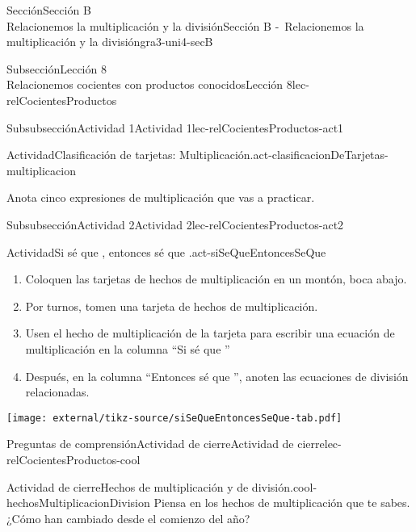 \begin{sectionptx}{Sección}{{\Large Sección B\\}Relacionemos la multiplicación y la división}{}{Sección B -~Relacionemos la multiplicación y la división}{}{}{gra3-uni4-secB}
\begin{subsectionptx}{Subsección}{{\normalsize Lección 8\\[-0.05cm]}Relacionemos cocientes con productos conocidos}{}{Lección 8}{}{}{lec-relCocientesProductos}
\begin{subsubsectionptx}{Subsubsección}{Actividad 1}{}{Actividad 1}{}{}{lec-relCocientesProductos-act1}
\begin{activity}{Actividad}{Clasificación de tarjetas: Multiplicación.}{act-clasificacionDeTarjetas-multiplicacion}
\begin{multicols}{2}
\begin{image}{0}{1}{0}{}
\end{image}%
\end{multicols}
Anota cinco expresiones de multiplicación que vas a practicar.%
\end{activity}%
\end{subsubsectionptx}
%
%
\typeout{************************************************}
\typeout{************************************************}
%
\begin{subsubsectionptx}{Subsubsección}{Actividad 2}{}{Actividad 2}{}{}{lec-relCocientesProductos-act2}
\begin{activity}{Actividad}{Si sé que \textellipsis{}, entonces sé que \textellipsis{}.}{act-siSeQueEntoncesSeQue}%
%
\begin{enumerate}
\item{}Coloquen las tarjetas de hechos de multiplicación en un montón, boca abajo.%
\item{}Por turnos, tomen una tarjeta de hechos de multiplicación.%
\item{}Usen el hecho de multiplicación de la tarjeta para escribir una ecuación de multiplicación en la columna “Si sé que \textellipsis{}”%
\item{}Después, en la columna “Entonces sé que   \textellipsis{}”, anoten las ecuaciones de división relacionadas.%
\end{enumerate}
\begin{image}{0}{1}{0}{}%
\texttt{[image: external/tikz-source/siSeQueEntoncesSeQue-tab.pdf]}
\end{image}%
\end{activity}%
\end{subsubsectionptx}
%
%
\typeout{************************************************}
\typeout{************************************************}
%
\begin{reading-questions-subsubsection}{Preguntas de comprensión}{Actividad de cierre}{}{Actividad de cierre}{}{}{lec-relCocientesProductos-cool}
\begin{project}{Actividad de cierre}{Hechos de multiplicación y de división.}{cool-hechosMultiplicacionDivision}%
Piensa en los hechos de multiplicación que te sabes. ¿Cómo han cambiado desde el comienzo del año?%
\end{project}%
\end{reading-questions-subsubsection}

\end{subsectionptx}
\end{sectionptx}
